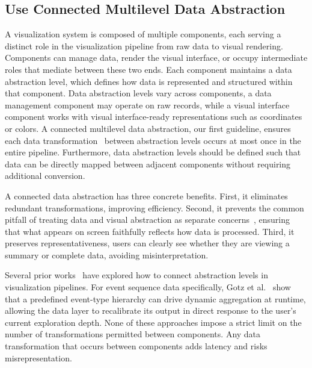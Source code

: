 \begin{refsection}
\subsection{Use Connected Multilevel Data Abstraction}
\label{subsec:connected_multi_level_abstraction}

A visualization system is composed of multiple components, each serving a distinct role in the visualization pipeline from raw data to visual rendering. Components can manage data, render the visual interface, or occupy intermediate roles that mediate between these two ends. Each component maintains a data abstraction level, which defines how data is represented and structured within that component. Data abstraction levels vary across components, a data management component may operate on raw records, while a visual interface component works with visual interface-ready representations such as coordinates or colors. A connected multilevel data abstraction, our first guideline, ensures each data transformation~\cite{kandel2011research} between abstraction levels occurs at most once in the entire pipeline. Furthermore, data abstraction levels should be defined such that data can be directly mapped between adjacent components without requiring additional conversion.

A connected data abstraction has three concrete benefits. First, it eliminates redundant transformations, improving efficiency. Second, it prevents the common pitfall of treating data and visual abstraction as separate concerns~\cite{battle2020structured, zinat2023comparative}, ensuring that what appears on screen faithfully reflects how data is processed. Third, it preserves representativeness, users can clearly see whether they are viewing a summary or complete data, avoiding misinterpretation.

Several prior works~\cite{elmqvist2009hierarchical, liu2013immens, tao2019kyrix, gotz2019visual, kruchten2022vegafusion, heer2023mosaic} have explored how to connect abstraction levels in visualization pipelines. For event sequence data specifically, Gotz et al.~\cite{gotz2019visual} show that a predefined event-type hierarchy can drive dynamic aggregation at runtime, allowing the data layer to recalibrate its output in direct response to the user's current exploration depth. None of these approaches impose a strict limit on the number of transformations permitted between components. Any data transformation that occurs between components adds latency and risks misrepresentation.


\end{refsection}
